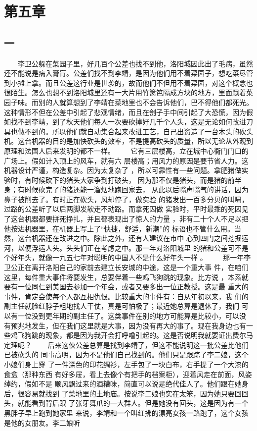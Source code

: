 \section{第五章} 
 
\subsection{一} 
 
 　　李卫公躲在菜园子里，好几百个公差也找不到他，洛阳城因此出了毛病，虽然 还不能说是病入膏肓。公差们找不到李靖，是因为他们用不着菜园子，想吃菜尽管 到小摊上拿。而且公差这行业是世袭的，故而他们不但用不着菜园，对这个概念也 很陌生。怎么也想不到洛阳城里还有一大片用竹篱笆隔成方块的地方，里面飘着菜 园子味。而别的人就算想到了李靖在菜地里也不会告诉他们，巴不得他们都死光。 这种情形不但在公差中引起了悲观情绪，而且在刽子手中间引起了大恐慌，因为假 如找不到李靖，到了秋天他们每人一次要砍掉好几千个人头，这是无论如何改进刀 具也做不到的。所以他们就自动集合起来改进工艺，自己出资造了一台木头的砍头 机。这台机器的目的是加快砍头的效率，不是提高砍头的质量，所以无论从外观到 原理和法国人后来发明的都不一样。 　　它有三层楼高，立在城中心衙门门口的广场上。假如计入顶上的风车，就有六 层楼高；用风力的原因是要节省人力。这机器设计严谨，构造复杂。因为太复杂了 ，所以可靠性有一些问题。拿肥猪做实验时，有时候砍下的猪头大家争到打破头， 因为那不仅是猪头，而是猪的前半身；有时候砍完了的猪还能一溜烟地跑回家去， 从此以后嗡声嗡气的讲话，因为鼻子被削去了。有时正在砍头，风却停了，做实验 的猪发出一百多分贝的叫啸，过路的公差听了以后两脚发软走不动路。而拿死囚做 实验时，平时最乖的死囚见了这台机器都要拼死挣扎，并且都表现出了惊人的力量 ，非有二十个人不足以把他按进机器里，在机器上写上了“快捷，舒适，新潮”的 标语也不管什么用。当然，这台机器还在改进之中。除此之外，还有人建议在市中 心到四门之间挖掘运河，以便浮运人头。头头们正在考虑之中。那一年对洛阳城里 的猪和公差可不是个好年头，就像一九五七年对聪明的中国人不是什么好年头一样 。 　　那一年李卫公正在离开洛阳自己的家前去建立长安城的中途，这是一个重大事 件，在咱们这里，每件重大事件将要发生，总要伴着一些鸡飞狗跳的现象。比方说 ，本系就要有一位同仁到美国去参加一个年会，或者又要多出一位正教授。这是最 重大的事件，肯定会使每个人都互相仇恨。比较重大的事件有：自从年初以来，我 们的副主任就脸红脖子粗地找人干仗，真是可怕极了；最近她总算是退休了，我们 可以有一位没到更年期的副主任了。这类事件在别的地方可能算是比较小，可以没 有预兆地发生，但在我们这里就是大事，因为没有再大的事了。现在我身边也有一 些鸡飞狗跳的现象，都是因为我开会打呼噜引起的。这是否说明我就要证出费尔马 定理呢？ 　　后来这伙公差总算是找到李靖了，但这不能说明这一批公差比他们已被砍头的 同事高明，因为不是他们自己找到的。他们只是跟踪了李二娘，这个小娘们身上穿 了一件深色的印花绸衫，左手包了一块白布，右手提了一个大漆的食盒（那种东西 有好多屉，看上去像个有把手的档案柜），迎着风走在前面，风姿绰约，假如不是 顺风飘过来的酒糟味，简直可以说是绝代佳人了。他们跟在她身后，很容易就找到 了菜地里的土地庙。按说李二娘也实在太笨，因为她只要回回头，就能看到背后跟 了张牙舞爪的一大群人。但是她没有回头，这是因为有一个黑胖子早上跑到她家里 来说，李靖和一个叫红拂的漂亮女孩一路跑了，这个女孩是他的女朋友。李二娘听 